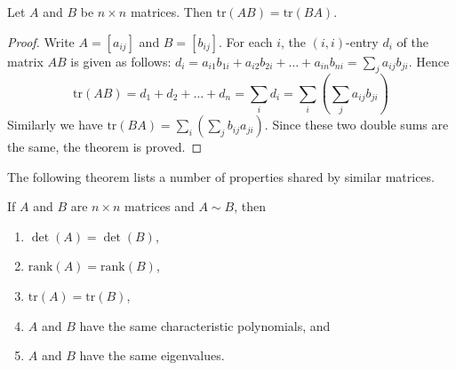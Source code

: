 \documentclass{ximera}
\begin{document}
\begin{theorem}\label{th:trAB=trBA}
Let $A$ and $B$ be $n \times n$ matrices. Then $\mbox{tr}(AB) = \mbox{tr}(BA)$.
\end{theorem}

\begin{proof}
Write $A = [a_{ij}]$ and $B = [b_{ij}]$. For each $i$, the $(i, i)$-entry $d_{i}$ of the matrix $AB$ is given as follows: $d_{i} = a_{i1}b_{1i} + a_{i2}b_{2i} + \dots + a_{in}b_{ni} = \sum_{j}a_{ij}b_{ji}$. Hence
\begin{equation*}
\mbox{tr}(AB) = d_1 + d_2 + \dots + d_n = \sum_{i}d_i = \sum_{i}\left(\sum_{j}a_{ij}b_{ji}\right)
\end{equation*}
Similarly we have $\mbox{tr}(BA) = \sum_{i}\left(\sum_{j}b_{ij}a_{ji}\right)$. Since these two double sums are the same, the theorem is proved.
\end{proof}

The following theorem lists a number of properties shared by similar matrices.

\begin{theorem}\label{th:properties_similar}
If $A$ and $B$ are $n\times n$ matrices and $A\sim B$, then
\begin{enumerate}
\item\label{th:properties_similar_det} $\det(A) = \det(B)$,
\item\label{th:properties_similar_rank} $\mbox{rank}(A) = \mbox{rank}(B)$,
\item\label{th:properties_similar_trace} $\mbox{tr}(A)= \mbox{tr}(B)$,
\item\label{th:properties_similar_char_poly} $A$ and $B$ have the same characteristic polynomials, and
\item\label{th:properties_similar_eig} $A$ and $B$ have the same eigenvalues.
\end{enumerate}
\end{theorem}
\end{document}
